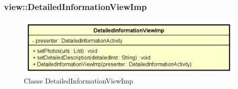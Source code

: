 \documentclass[../DefinizioneDiProdotto.tex]{subfiles}
\begin{document}
\subsubsection{view::DetailedInformationViewImp}

    \begin{figure}[H]
        \centering
        \includegraphics{img/DetailedInformationViewImp.png}
        \caption{Classe DetailedInformationViewImp}\label{fig:view::DetailedInformationViewImp} 
    \end{figure}
\end{document}
